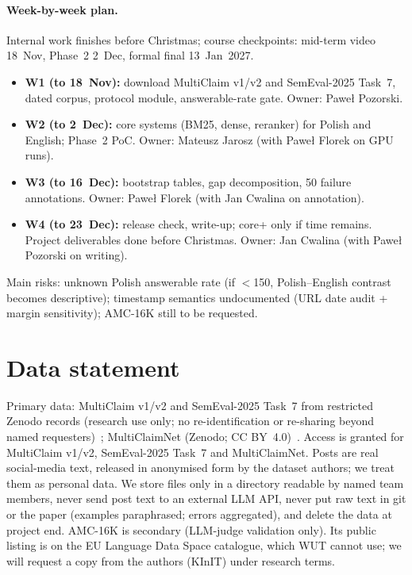 \documentclass[11pt]{article}
\begin{document}
\paragraph{Week-by-week plan.}
Internal work finishes before Christmas; course checkpoints: mid-term video 18~Nov, Phase~2 2~Dec, formal final 13~Jan~2027.
\begin{itemize}
\setlength\itemsep{0pt}
\item \textbf{W1 (to 18~Nov):} download MultiClaim v1/v2 and SemEval-2025 Task~7, dated corpus, protocol module, answerable-rate gate.
  Owner: Pawe{\l} Pozorski.
\item \textbf{W2 (to 2~Dec):} core systems (BM25, dense, reranker) for Polish and English; Phase~2 PoC.
  Owner: Mateusz Jarosz (with Pawe{\l} Florek on GPU runs).
\item \textbf{W3 (to 16~Dec):} bootstrap tables, gap decomposition, 50 failure annotations.
  Owner: Pawe{\l} Florek (with Jan Cwalina on annotation).
\item \textbf{W4 (to 23~Dec):} release check, write-up; core+ only if time remains. Project deliverables done before Christmas.
  Owner: Jan Cwalina (with Pawe{\l} Pozorski on writing).
\end{itemize}
Main risks: unknown Polish answerable rate (if $<$150, Polish--English contrast becomes descriptive); timestamp semantics undocumented (URL date audit + margin sensitivity); AMC-16K still to be requested.

\section{Data statement}
\label{sec:datastmt}
Primary data: MultiClaim v1/v2 and SemEval-2025 Task~7 from restricted Zenodo records (research use only; no re-identification or re-sharing beyond named requesters)~\cite{moro2025multiclaim,pikuliak2023multilingual,peng2025semeval}; MultiClaimNet (Zenodo; CC BY~4.0)~\cite{panchendrarajan2025multiclaimnet}.
Access is granted for MultiClaim v1/v2, SemEval-2025 Task~7 and MultiClaimNet.
Posts are real social-media text, released in anonymised form by the dataset authors; we treat them as personal data.
We store files only in a directory readable by named team members, never send post text to an external LLM API, never put raw text in git or the paper (examples paraphrased; errors aggregated), and delete the data at project end.
AMC-16K is secondary (LLM-judge validation only). Its public listing is on the EU Language Data Space catalogue, which WUT cannot use; we will request a copy from the authors (KInIT) under research terms.
\end{document}
